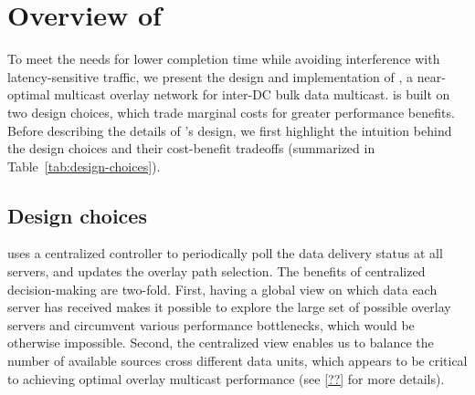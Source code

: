 \section{Overview of \name}
\label{sec:overview}

To meet the needs for lower completion time while avoiding
interference with latency-sensitive traffic, we present 
the design and implementation of \name, a near-optimal
multicast overlay network for inter-DC bulk data multicast.
\name is built on two design choices, which
trade marginal costs for greater performance benefits. 
Before describing the details of \name's design, we first
highlight the intuition behind the design choices and
their cost-benefit tradeoffs 
(summarized in Table~\ref{tab:design-choices}).



\subsection{Design choices}

\name uses a centralized controller to periodically poll 
the data delivery
status at all servers, and updates the overlay path selection.
The benefits of centralized decision-making are
two-fold. 
First, having a global view on which data each server has 
received makes it possible to explore the large set of possible 
overlay servers and circumvent various performance bottlenecks,
which would be otherwise impossible. 
Second, the centralized view enables us to 
balance the number of available sources 
cross different data units, which appears to be critical to 
achieving optimal overlay multicast performance (see 
\Section\ref{??} for more details).



